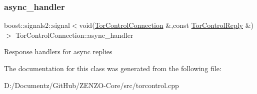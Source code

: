 \subsubsection{\texorpdfstring{async\_handler}{async\_handler}}
{\footnotesize\ttfamily boost\+::signals2\+::signal$<$void(\mbox{\hyperlink{class_tor_control_connection}{Tor\+Control\+Connection}} \&,const \mbox{\hyperlink{class_tor_control_reply}{Tor\+Control\+Reply}} \&)$>$ Tor\+Control\+Connection\+::async\+\_\+handler}

Response handlers for async replies 

The documentation for this class was generated from the following file\+:\begin{DoxyCompactItemize}
\item 
D\+:/\+Documentz/\+Git\+Hub/\+Z\+E\+N\+Z\+O-\/\+Core/src/torcontrol.\+cpp\end{DoxyCompactItemize}
